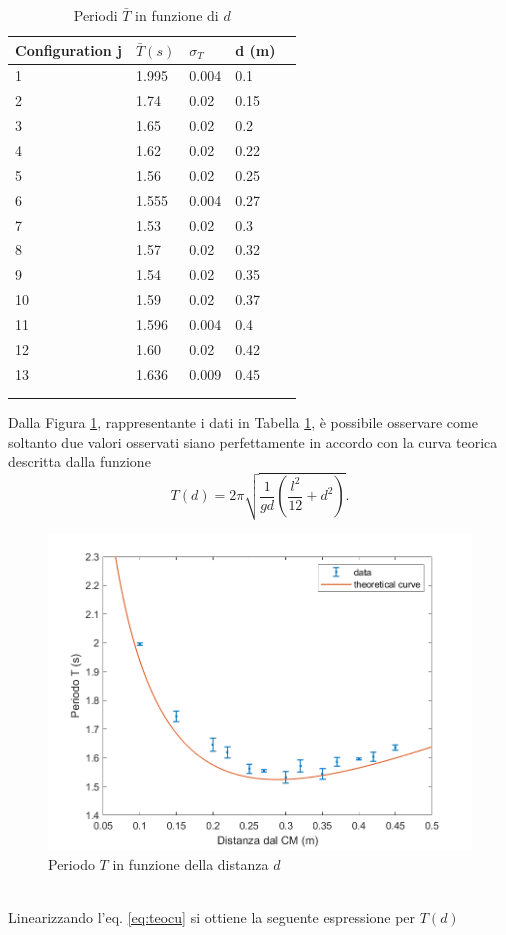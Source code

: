 \documentclass[11pt,a4paper]{article}
\begin{document}
\begin{longtable}[]{@{}lllll@{}}
    \toprule
    Configuration j & $\bar{T} (s)$ & $\sigma_T$ & d (m) \tabularnewline
    \midrule
    \endhead
1 & 1.995 & 0.004 & 0.1 \tabularnewline
2 & 1.74 & 0.02 & 0.15 \tabularnewline
3 & 1.65 & 0.02 & 0.2 \tabularnewline
4 & 1.62 & 0.02 & 0.22 \tabularnewline
5 & 1.56 & 0.02 & 0.25 \tabularnewline
6 & 1.555 & 0.004 & 0.27 \tabularnewline
7 & 1.53 & 0.02 & 0.3 \tabularnewline
8 & 1.57 & 0.02 & 0.32 \tabularnewline
9 & 1.54 & 0.02 & 0.35 \tabularnewline
10 & 1.59 & 0.02 & 0.37 \tabularnewline
11 & 1.596 & 0.004 & 0.4 \tabularnewline
12 & 1.60 & 0.02 & 0.42 \tabularnewline
13 & 1.636 & 0.009 & 0.45 \tabularnewline
    \bottomrule
    \\
    \caption{Periodi $\bar{T}$ in funzione di $d$}
    \label{tab:td}
\end{longtable}
Dalla Figura \ref{fig:teocu}, rappresentante i dati in Tabella \ref{tab:td}, è possibile osservare come soltanto due valori osservati siano perfettamente in accordo con la curva teorica descritta dalla funzione
\begin{equation}
    T(d) = 2 \pi \sqrt{\frac{1}{gd} \left( \frac{l^2}{12} + d^2 \right)}.
    \label{eq:teocu}
\end{equation}
\begin{figure}
    \centering
    \includegraphics[scale=0.8]{img/plot2.png}
    \caption{Periodo $T$ in funzione della distanza $d$}
    \label{fig:teocu}
\end{figure}
\\
Linearizzando l'eq. \ref{eq:teocu} si ottiene la seguente espressione per $T(d)$
\end{document}

